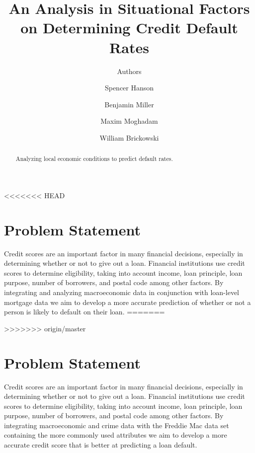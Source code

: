 \documentclass[sigconf, 11pt]{acmart}
\begin{document}
\title{An Analysis in Situational Factors on Determining Credit Default Rates}
\subtitle{Authors}

\author{Spencer Hanson}
\affiliation{}

\author{Benjamin Miller}
\affiliation{}

\author{Maxim Moghadam}
\affiliation{}

\author{William Brickowski}
\affiliation{}

\begin{abstract}
Analyzing local economic conditions to predict default rates.
\end{abstract}

<<<<<<< HEAD
\section{Problem Statement}
Credit scores are an important factor in many financial decisions, especially in determining whether or not to give out a loan. Financial institutions use credit scores to determine eligibility, taking into account income, loan principle, loan purpose, number of borrowers, and postal code among other factors. By integrating and analyzing macroeconomic data in conjunction with loan-level mortgage data we aim to develop a more accurate prediction of whether or not a person is likely to default on their loan.
=======
\maketitle


>>>>>>> origin/master

\section{Problem Statement}
Credit scores are an important factor in many financial decisions, especially in determining whether or not to give out a loan. Financial institutions use credit scores to determine eligibility, taking into account income, loan principle, loan purpose, number of borrowers, and postal code among other factors. By integrating macroeconomic and crime data with the Freddie Mac data set containing the more commonly used attributes we aim to develop a more accurate credit score that is better at predicting a loan default.
\end{document}

